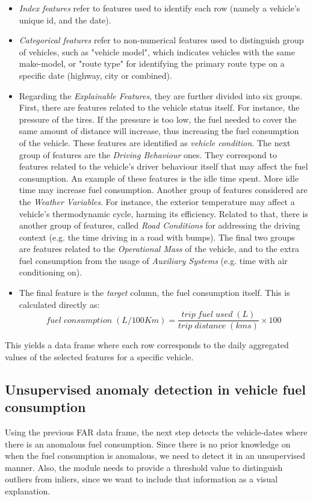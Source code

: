 \begin{itemize}
    \item \emph{Index features} refer to features used to identify each row (namely a vehicle's unique id, and the date).
    \item \emph{Categorical features} refer to non-numerical features used to distinguish group of vehicles, such as "vehicle model", which indicates vehicles with the same make-model, or "route type" for identifying the primary route type on a specific date (highway, city or combined). 
    \item Regarding the \emph{Explainable Features}, they are further divided into six groups. First, there are features related to the vehicle status itself. For instance, the pressure of the tires. If the pressure is too low, the fuel needed to cover the same amount of distance will increase, thus increasing the fuel consumption of the vehicle. These features are identified as \emph{vehicle condition}. 
    The next group of features are the \emph{Driving Behaviour} ones. They correspond to features related to the vehicle's driver behaviour itself that may affect the fuel consumption. An example of these features is the idle time spent. More idle time may increase fuel consumption.
    Another group of features considered are the \emph{Weather Variables}. For instance, the exterior temperature may affect a vehicle's thermodynamic cycle, harming its efficiency. Related to that, there is another group of features, called \emph{Road Conditions} for addressing the driving context (e.g. the time driving in a road with bumps). The final two groups are features related to the \emph{Operational Mass} of the vehicle, and to the extra fuel consumption from the usage of \emph{Auxiliary Systems} (e.g. time with air conditioning on). 
    \item The final feature is the \emph{target} column, the fuel consumption itself. This is calculated directly as: 
    \begin{equation}
    fuel\;consumption\;(L/100Km) =  \frac{trip\;fuel\;used\; (L)}{trip\;distance\;(kms)} \times 100
    \end{equation}
\end{itemize}

This yields a data frame where each row corresponds to the daily aggregated values of the selected features for a specific vehicle. 

\subsection{Unsupervised anomaly detection in vehicle fuel consumption}\label{subsec:ch6-anomaly-detection}
Using the previous FAR data frame, the next step detects the vehicle-dates where there is an anomalous fuel consumption. Since there is no prior knowledge on when the fuel consumption is anomalous, we need to detect it in an unsupervised manner. Also, the module needs to provide a threshold value to distinguish outliers from inliers, since we want to include that information as a visual explanation.

